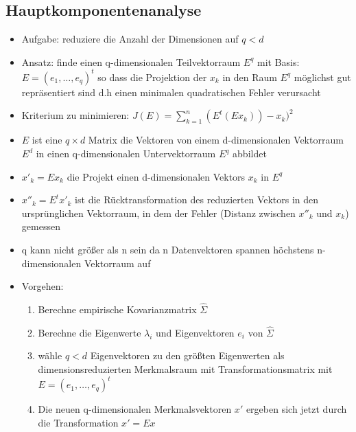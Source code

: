 \documentclass{article} %
\begin{document}
	\subsection{Hauptkomponentenanalyse}
	\begin{itemize}
		\item Aufgabe: reduziere die Anzahl der Dimensionen auf $q < d$
		\item Ansatz: finde einen q-dimensionalen Teilvektorraum $E^q$ mit Basis: $E = (e_1,\dots,e_q)^t$ so dass die Projektion der $x_k$ in den Raum $E^q$ möglichst gut repräsentiert sind d.h einen minimalen quadratischen Fehler verursacht
		\item Kriterium zu minimieren: $J(E) = \sum_{k=1}^{n}(E^t(Ex_k))-x_k)^2$
		\item $E$ ist eine $q\times d$ Matrix die Vektoren von einem d-dimensionalen Vektorraum $E^d$ in einen q-dimensionalen Untervektorraum $E^q$ abbildet
		\item $x'_k = Ex_k$ die Projekt einen d-dimensionalen Vektors $x_k$ in $E^q$
		\item $x''_k = E^tx'_k$ ist die Rücktransformation des reduzierten Vektors in den ursprünglichen Vektorraum, in dem der Fehler (Distanz zwischen $x''_k$ und $x_k$) gemessen
		\item q kann nicht größer als n sein da n Datenvektoren spannen höchstens n-dimensionalen Vektorraum auf
		\item Vorgehen:
		\begin{enumerate}
			\item Berechne empirische Kovarianzmatrix $\hat{\Sigma}$
			\item Berechne die Eigenwerte $\lambda_i$ und Eigenvektoren $e_i$ von $\hat{\Sigma}$
			\item wähle $q<d$ Eigenvektoren zu den größten Eigenwerten als dimensionsreduzierten Merkmalsraum mit Transformationsmatrix mit $E = (e_1,\dots,e_q)^t$
			\item Die neuen q-dimensionalen Merkmalsvektoren $x'$ ergeben sich jetzt durch die Transformation $x' = Ex$
		\end{enumerate}
	\end{itemize}
\end{document}
